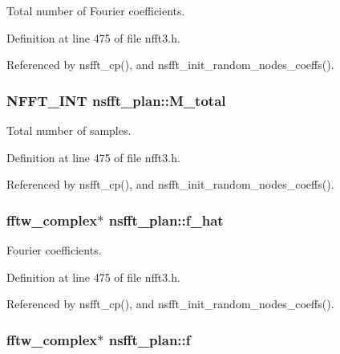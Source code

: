 Total number of Fourier coefficients. 



Definition at line 475 of file nfft3.\-h.



Referenced by nsfft\-\_\-cp(), and nsfft\-\_\-init\-\_\-random\-\_\-nodes\-\_\-coeffs().

\hypertarget{structnsfft__plan_a4037cd83b64fbf025711dd7c78e8543b}{
\subsubsection[{M\-\_\-total}]{\setlength{\rightskip}{0pt plus 5cm}N\-F\-F\-T\-\_\-\-I\-N\-T nsfft\-\_\-plan\-::\-M\-\_\-total}}\label{structnsfft__plan_a4037cd83b64fbf025711dd7c78e8543b}


Total number of samples. 



Definition at line 475 of file nfft3.\-h.



Referenced by nsfft\-\_\-cp(), and nsfft\-\_\-init\-\_\-random\-\_\-nodes\-\_\-coeffs().

\hypertarget{structnsfft__plan_ae3e2fcefd21caff3aa1e978b522d4ee3}{
\subsubsection[{f\-\_\-hat}]{\setlength{\rightskip}{0pt plus 5cm}fftw\-\_\-complex$\ast$ nsfft\-\_\-plan\-::f\-\_\-hat}}\label{structnsfft__plan_ae3e2fcefd21caff3aa1e978b522d4ee3}


Fourier coefficients. 



Definition at line 475 of file nfft3.\-h.



Referenced by nsfft\-\_\-cp(), and nsfft\-\_\-init\-\_\-random\-\_\-nodes\-\_\-coeffs().

\hypertarget{structnsfft__plan_a7ffefff1410360f4264e12398db06787}{
\subsubsection[{f}]{\setlength{\rightskip}{0pt plus 5cm}fftw\-\_\-complex$\ast$ nsfft\-\_\-plan\-::f}}\label{structnsfft__plan_a7ffefff1410360f4264e12398db06787}



